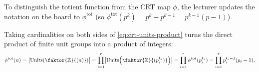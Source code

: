 \begin{content}
To distinguish the totient function from the CRT map $\phi$, the lecturer updates the notation on the board to $\phi^{\text{tot}}$ (so $\phi^{\text{tot}}(p^k) = p^k - p^{k-1} = p^{k-1}(p - 1)$).


\begin{steps}
Taking cardinalities on both sides of \eqref{eq:crt-units-product} turns the direct product of finite unit groups into a product of integers:
\[
\phi^{\text{tot}}(n) = \bigl|\operatorname{Units}\!\left(\faktor{\mathbb{Z}}{(n)}\right)\bigr| = \prod_{i=1}^r \bigl|\operatorname{Units}\!\left(\faktor{\mathbb{Z}}{(p_i^{k_i})}\right)\bigr| = \prod_{i=1}^r \phi^{\text{tot}}(p_i^{k_i}) = \prod_{i=1}^r p_i^{k_i - 1}(p_i - 1).
\]
\end{steps}
\end{content}


